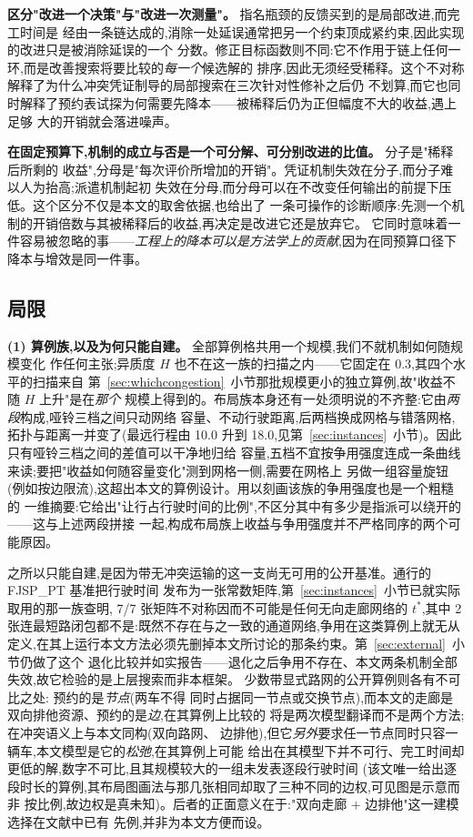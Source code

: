 \documentclass[manuscript,screen,review]{acmart}
\newcommand{\LegDumbbell}{10.0}          %
\newcommand{\LegGrid}{18.0}              %
\newcommand{\PubNLayout}{7}
\newcommand{\PubNLayoutAsym}{7}           %
\newcommand{\PubNLayoutBad}{2}            %
\begin{document}
\textbf{区分"改进一个决策"与"改进一次测量"。} 指名瓶颈的反馈买到的是局部改进,而完工时间是
经由一条链达成的,消除一处延误通常把另一个约束顶成紧约束,因此实现的改进只是被消除延误的一个
分数。修正目标函数则不同:它不作用于链上任何一环,而是改善搜索将要比较的\emph{每一个}候选解的
排序,因此无须经受稀释。这个不对称解释了为什么冲突凭证制导的局部搜索在三次针对性修补之后仍
不划算,而它也同时解释了预约表试探为何需要先降本——被稀释后仍为正但幅度不大的收益,遇上足够
大的开销就会落进噪声。

\textbf{在固定预算下,机制的成立与否是一个可分解、可分别改进的比值。} 分子是"稀释后所剩的
收益",分母是"每次评价所增加的开销"。凭证机制失效在分子,而分子难以人为抬高;派遣机制起初
失效在分母,而分母可以在不改变任何输出的前提下压低。这个区分不仅是本文的取舍依据,也给出了
一条可操作的诊断顺序:先测一个机制的开销倍数与其被稀释后的收益,再决定是改进它还是放弃它。
它同时意味着一件容易被忽略的事——\emph{工程上的降本可以是方法学上的贡献},因为在同预算口径下
降本与增效是同一件事。

\subsection{局限}
\label{sec:limitations}

\textbf{(1) 算例族,以及为何只能自建。} 全部算例格共用一个规模,我们不就机制如何随规模变化
作任何主张;异质度 $H$ 也不在这一族的扫描之内——它固定在 $0.3$,其四个水平的扫描来自
第~\ref{sec:whichcongestion}~小节那批规模更小的独立算例,故"收益不随 $H$ 上升"是在\emph{那个}
规模上得到的。布局族本身还有一处须明说的不齐整:它由\emph{两段}构成,哑铃三档之间只动网络
容量、不动行驶距离,后两档换成网格与错落网格,拓扑与距离一并变了(最远行程由 \LegDumbbell{}
升到 \LegGrid{},见第~\ref{sec:instances}~小节)。因此只有哑铃三档之间的差值可以干净地归给
容量,五档不宜按争用强度连成一条曲线来读;要把"收益如何随容量变化"测到网格一侧,需要在网格上
另做一组容量旋钮(例如按边限流),这超出本文的算例设计。用以刻画该族的争用强度也是一个粗糙的
一维摘要:它给出"让行占行驶时间的比例",不区分其中有多少是指派可以绕开的——这与上述两段拼接
一起,构成布局族上收益与争用强度并不严格同序的两个可能原因。

之所以只能自建,是因为带无冲突运输的这一支尚无可用的公开基准。通行的 FJSP\_PT 基准把行驶时间
发布为一张常数矩阵,第~\ref{sec:instances}~小节已就实际取用的那一族查明,
\PubNLayoutAsym{}/\PubNLayout{} 张矩阵不对称因而不可能是任何无向走廊网络的 $t^{*}$,其中
\PubNLayoutBad{} 张连最短路闭包都不是:既然不存在与之一致的通道网络,争用在这类算例上就无从
定义,在其上运行本文方法必须先删掉本文所讨论的那条约束。第~\ref{sec:external}~小节仍做了这个
退化比较并如实报告——退化之后争用不存在、本文两条机制全部失效,故它检验的是上层搜索而非本框架。
少数带显式路网的公开算例则各有不可比之处:\cite{vanos2026exact} 预约的是\emph{节点}(两车不得
同时占据同一节点或交换节点),而本文的走廊是双向排他资源、预约的是\emph{边},在其算例上比较的
将是两次模型翻译而不是两个方法;\cite{lyu2019approach} 在冲突语义上与本文同构(双向路网、
边排他),但它\emph{另外}要求任一节点同时只容一辆车,本文模型是它的\emph{松弛},在其算例上可能
给出在其模型下并不可行、完工时间却更低的解,数字不可比,且其规模较大的一组未发表逐段行驶时间
(该文唯一给出逐段时长的算例,其布局图画法与那几张相同却取了三种不同的边权,可见图是示意而非
按比例,故边权是真未知)。后者的正面意义在于:"双向走廊 $+$ 边排他"这一建模选择在文献中已有
先例,并非为本文方便而设。
\end{document}
